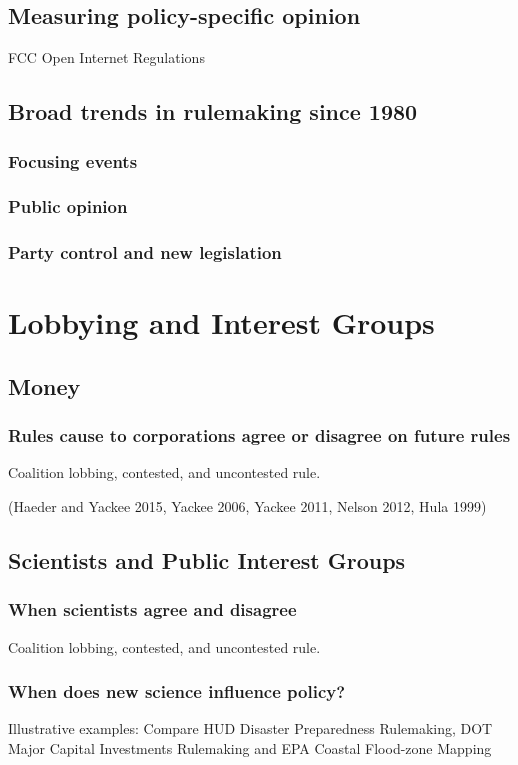 \subsection{Measuring policy-specific opinion}
FCC Open Internet Regulations
\subsection{Broad trends in rulemaking since 1980}
\subsubsection{Focusing events}
\subsubsection{Public opinion}
\subsubsection{Party control and new legislation}

\section{Lobbying and Interest Groups}

\subsection{Money}
\subsubsection{Rules cause to corporations agree or disagree on future rules}
Coalition lobbing, contested, and uncontested rule.

(Haeder and Yackee 2015, Yackee 2006, Yackee 2011, Nelson 2012, Hula 1999)

\subsection{Scientists and Public Interest Groups}
\subsubsection{When scientists agree and disagree}
Coalition lobbing, contested, and uncontested rule.

\subsubsection{When does new science influence policy?}
Illustrative examples: Compare HUD Disaster Preparedness Rulemaking, DOT Major Capital Investments Rulemaking and EPA Coastal Flood-zone Mapping
